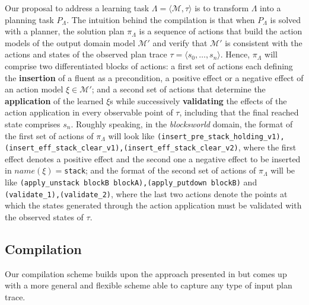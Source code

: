 \documentclass[runningheads]{llncs}
\newcommand{\tup}[1]{{\langle #1 \rangle}}
\begin{document}
Our proposal to address a learning task $\Lambda=\tup{\mathcal{M},\tau}$ is to transform $\Lambda$ into a planning task $P_{\Lambda}$. The intuition behind the compilation is that when $P_{\Lambda}$ is solved with a planner, the solution plan $\pi_\Lambda$ is a sequence of actions that build the action models of the output domain model $\mathcal{M'}$ and verify that $\mathcal{M'}$ is consistent with the actions and states of the observed plan trace $\tau = \tup {s_0, \ldots, s_n}$. Hence, $\pi_\Lambda$ will comprise two differentiated blocks of actions: a first set of actions each defining the \textbf{insertion} of a fluent as a precondition, a positive effect or a negative effect of an action model $\xi \in \mathcal{M'}$; and a second set of actions that determine the \textbf{application} of the learned $\xi$s while successively \textbf{validating} the effects of the action application in every observable point of $\tau$, including that the final reached state comprises $s_n$. Roughly speaking, in the \emph{blocksworld} domain, the format of the first set of actions of $\pi_\Lambda$ will look like {\tt{\small (insert\_pre\_stack\_holding\_v1),(insert\_eff\_stack\_clear\_v1),(insert\_eff\_stack\_clear\_v2)}}, where the first effect denotes a positive effect and the second one a negative effect to be inserted in $name(\xi)=${\tt{\small stack}}; and the format of the second set of actions of $\pi_\Lambda$ will be like {\tt{\small (apply\_unstack blockB blockA),(apply\_putdown blockB)}} and {\tt{\small (validate\_1),(validate\_2)}}, where the last two actions denote the points at which the states generated through the action application must be validated with the observed states of $\tau$.

\subsection{Compilation}
Our compilation scheme builds upon the approach presented in \cite{aineto2018learning} but \FAMA comes up with a more general and flexible scheme able to capture any type of input plan trace.

\vspace{0.1cm}
\end{document}
